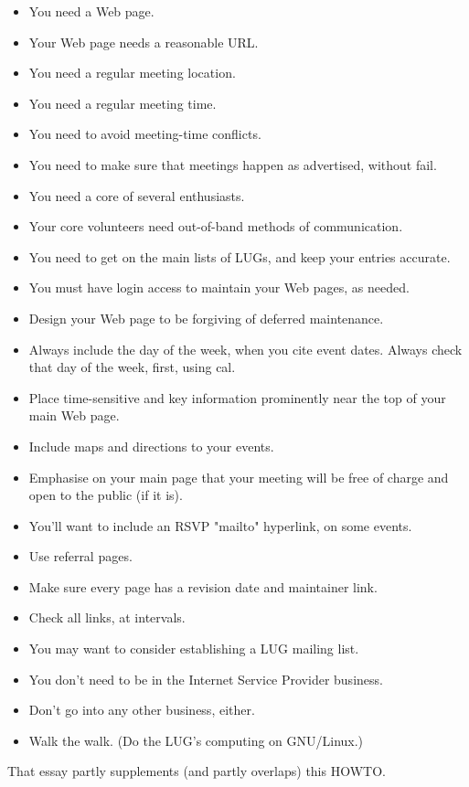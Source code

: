 \documentclass{HOWTO}
\begin{document}
\begin{itemize}
\item You need a Web page.
\item Your Web page needs a reasonable URL.
\item You need a regular meeting location.
\item You need a regular meeting time.
\item You need to avoid meeting-time conflicts.
\item You need to make sure that meetings happen as advertised, without fail.
\item You need a core of several enthusiasts.
\item Your core volunteers need out-of-band methods of communication.
\item You need to get on the main lists of LUGs, and keep your entries accurate.
\item You must have login access to maintain your Web pages, as needed.
\item Design your Web page to be forgiving of deferred maintenance.
\item Always include the day of the week, when you cite event dates. Always check that day of the week, first, using cal.
\item Place time-sensitive and key information prominently near the top of your main Web page.
\item Include maps and directions to your events.
\item Emphasise on your main page that your meeting will be free of charge and open to the public (if it is).
\item You'll want to include an RSVP "mailto" hyperlink, on some events.
\item Use referral pages.
\item Make sure every page has a revision date and maintainer link.
\item Check all links, at intervals.
\item You may want to consider establishing a LUG mailing list.
\item You don't need to be in the Internet Service Provider business.
\item Don't go into any other business, either.
\item Walk the walk. (Do the LUG's computing on GNU/Linux.)
\end{itemize}


That essay partly supplements (and partly overlaps) this HOWTO.
\end{document}
